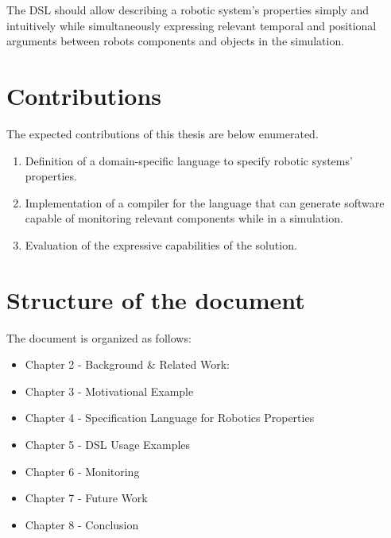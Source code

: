 The DSL should allow describing a robotic system's properties simply and intuitively while simultaneously expressing relevant temporal and positional arguments between robots components and objects in the simulation.


\section{Contributions}
\label{sec:contributions}

The expected contributions of this thesis are below enumerated.

\begin{enumerate}
    \item Definition of a domain-specific language to specify robotic systems' properties.
    \item Implementation of a compiler for the language that can generate software capable of monitoring relevant components while in a simulation.
    \item Evaluation of the expressive capabilities of the solution.
\end{enumerate}

\section{Structure of the document}
\label{sec:structure}

The document is organized as follows:

\begin{itemize}
    \item Chapter 2 - Background \& Related Work:
    \item Chapter 3 - Motivational Example
    \item Chapter 4 - Specification Language for Robotics Properties
    \item Chapter 5 - DSL Usage Examples
    \item Chapter 6 - Monitoring
    \item Chapter 7 - Future Work
    \item Chapter 8 - Conclusion
\end{itemize}
